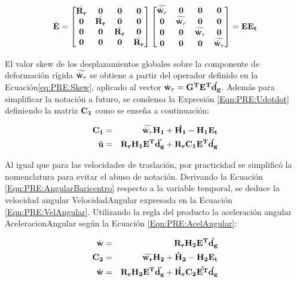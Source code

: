 \begin{equation}
\dot{\bf{E}}=\begin{bmatrix}
	\dot{\bf{R}_r} & \bf{0} & \bf{0} & \bf{0} \\
	\bf{0}&\dot{\bf{R}_r}  & \bf{0} & \bf{0}\\
	\bf{0}& \bf{0} & \dot{\bf{R}_r} & \bf{0}\\
	\bf{0}& \bf{0} & \bf{0} & \dot{\bf{R}_r}
\end{bmatrix}\begin{bmatrix}
	\widetilde{\dot{\bf{w}}_r} & \bf{0} & \bf{0} & \bf{0} \\
	\bf{0}& \widetilde{\dot{\bf{w}}_r}  & \bf{0} & \bf{0}\\
	\bf{0}& \bf{0} & \widetilde{\dot{\bf{w}}_r} & \bf{0}\\
	\bf{0}& \bf{0} & \bf{0} & \widetilde{\dot{\bf{w}}_r}
\end{bmatrix}=\bf{E}\bf{E}_t
\end{equation}

El valor skew de los desplazamientos globales sobre la componente de deformación rígida $\widetilde{\dot{\bf{w}}_r}$ se obtiene a partir del operador definido en la Ecuación\eqref{eq:PRE:Skew}, aplicado al vector $\dot{\bf{w}}_r=\bf{G}^T\bf{E}^T\dot{\bf{d}_g}$. Además para simplificar la notación a futuro, se condensa la Expresión \eqref{Eqn:PRE:Udotdot} definiendo la matriz $\bf{C}_1$ como se enseña a continuación:

\begin{eqnarray}
	\label{Eqn:PRE:DefC1}
    \bf{C}_1 &=& \widetilde{\dot{\bf{w}}_r}\bf{H_1}+\dot{\bf{H}_1}-\bf{H}_1\bf{E}_t\\
    \label{Eqn:PRE:UdotdotC1}
    \ddot{\bf{u}} &=&\bf{R}_r\bf{H}_1\bf{E}^T\ddot{{d}_g}+\bf{R}_r\bf{C}_1\bf{E}^T\dot{{d}_g}
\end{eqnarray}

Al igual que para las velocidades de traslación, por practicidad se simplificó la nomenclatura para evitar el abuso de notación. Derivando la Ecuación \eqref{Eqn:PRE:AngularBaricentro} respecto a la variable temporal, se deduce la velocidad angular \gls{VelocidadAngular} expresada en la Ecuación \eqref{Eqn:PRE:VelAngular}. Utilizando la regla del producto la aceleración angular  \gls{AceleracionAngular} según la Ecuación \eqref{Eqn:PRE:AcelAngular}:

\begin{eqnarray}
	\label{Eqn:PRE:VelAngular}
	\dot{\bf{w}}&=&\bf{R}_r\bf{H}_2\bf{E}^T\dot{{\bf{d_g}}}\\
	\label{Eqn:PRE:DefC}
	\bf{C}_2&=&\widetilde{\bf{w}_r}\bf{H}_2+\bf{\dot{H}_2}-\bf{H}_2\bf{E}_t\\
	\label{Eqn:PRE:AcelAngular}
	\ddot{\bf{w}}&=&\bf{R}_r\bf{H}_2\bf{E}^T\ddot{{\bf{d_g}}}+ \dot{\bf{R}_r} \bf{C}_2 \dot{\bf{E}^T} \dot{ \bf{d}_g }
\end{eqnarray}

